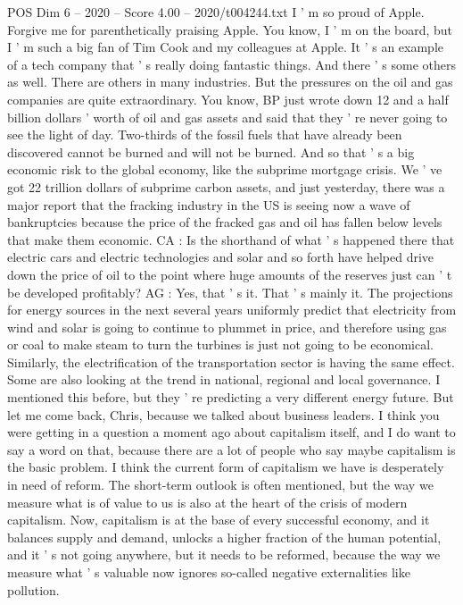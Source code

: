\begin{textsample}{POS Dim 6 – 2020 – Score 4.00 – 2020/t004244.txt}
I ' m so proud of Apple.
Forgive me for parenthetically praising Apple.
You know, I ' m on the board, but I ' m such a big fan of Tim Cook and my colleagues at Apple.
It ' s an example of a tech company that ' s really doing fantastic things.
And there ' s some others as well.
There are others in many industries.
But the pressures on the oil and gas companies are quite extraordinary.
You know, BP just wrote down 12 and a half billion dollars ' worth of oil and gas assets and said that they ' re never going to see the light of day.
Two-thirds of the fossil fuels that have already been discovered cannot be burned and will not be burned.
And so that ' s a big economic risk to the global economy, like the subprime mortgage crisis.
We ' ve got 22 trillion dollars of subprime carbon assets, and just yesterday, there was a major report that the fracking industry in the US is seeing now a wave of bankruptcies because the price of the fracked gas and oil has fallen below levels that make them economic.
CA : Is the shorthand of what ' s happened there that electric cars and electric technologies and solar and so forth have helped drive down the price of oil to the point where huge amounts of the reserves just can ' t be developed profitably?
AG : Yes, that ' s it.
That ' s mainly it.
The projections for energy sources in the next several years uniformly predict that electricity from wind and solar is going to continue to plummet in price, and therefore using gas or coal to make steam to turn the turbines is just not going to be economical.
Similarly, the electrification of the transportation sector is having the same effect.
Some are also looking at the trend in national, regional and local governance.
I mentioned this before, but they ' re predicting a very different energy future.
But let me come back, Chris, because we talked about business leaders.
I think you were getting in a question a moment ago about capitalism itself, and I do want to say a word on that, because there are a lot of people who say maybe capitalism is the basic problem.
I think the current form of capitalism we have is desperately in need of reform.
The short-term outlook is often mentioned, but the way we measure what is of value to us is also at the heart of the crisis of modern capitalism.
Now, capitalism is at the base of every successful economy, and it balances supply and demand, unlocks a higher fraction of the human potential, and it ' s not going anywhere, but it needs to be reformed, because the way we measure what ' s valuable now ignores so-called negative externalities like pollution.

\end{textsample}

